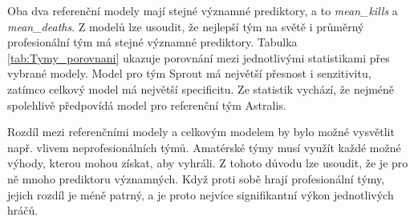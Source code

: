 

Oba dva referenční modely mají stejné významné prediktory, a to \textit{mean\_kills} a \textit{mean\_deaths}. Z modelů lze usoudit, že nejlepší tým na světě i průměrný
profesionální tým má stejné významné prediktory. Tabulka \ref{tab:Tymy_porovnani} ukazuje porovnání mezi jednotlivými statistikami přes vybrané modely. Model pro tým
Sprout má největší přesnost  i senzitivitu, zatímco celkový model má největší specificitu. Ze statistik vychází, že nejméně spolehlivě předpovídá model pro
referenční tým Astralis. 

Rozdíl mezi referenčními modely a celkovým modelem by bylo možné vysvětlit např. vlivem neprofesionálních týmů. Amatérské týmy musí využít každé možné výhody,
kterou mohou získat, aby vyhráli. Z tohoto důvodu lze usoudit, že je pro ně mnoho prediktoru významných. Když proti sobě hrají profesionální týmy, jejich rozdíl je
méně patrný, a je proto nejvíce signifikantní výkon jednotlivých hráčů.